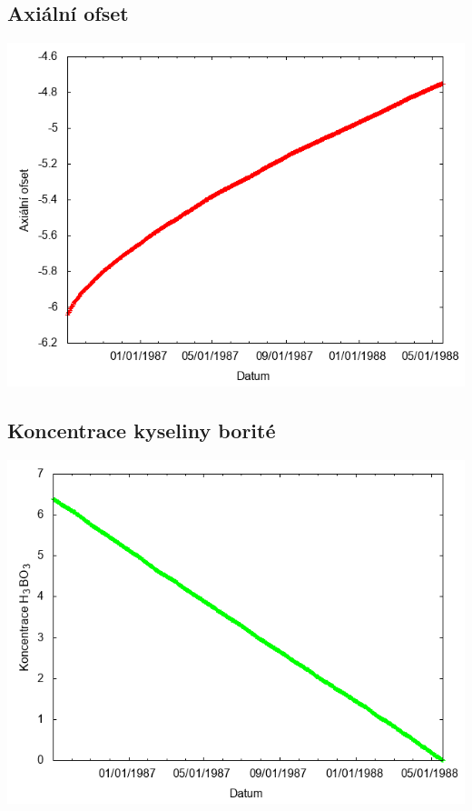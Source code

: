 \documentclass[a4paper,twoside,11pt]{article}
\begin{document}
\subsection*{Axiální ofset}
\begin{center}
\includegraphics[width=.8\textwidth]{graphs/CandyMountain_04_ao.png}
\end{center}

\subsection*{Koncentrace kyseliny borité}
\begin{center}
\includegraphics[width=.8\textwidth]{graphs/CandyMountain_04_bc.png}
\end{center}
\end{document}

